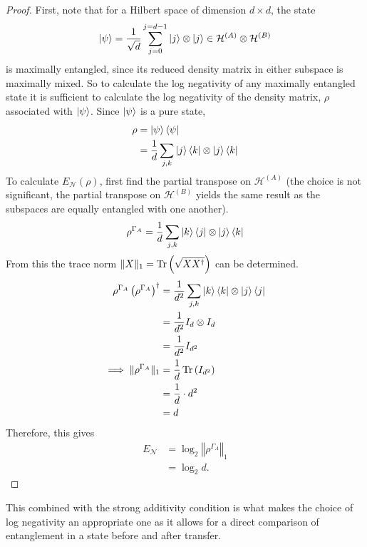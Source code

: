 \begin{proof}
    First, note that for a Hilbert space of dimension $d\times d$, the state
    \begin{equation}
        \ket{\psi} = \frac{1}{\sqrt{d}}\sum_{j=0}^{j=d-1}\ket{j}\otimes\ket{j}\in \mathcal{H}^{(A)} \otimes \mathcal{H}^{(B)}
    \end{equation}
    is maximally entangled, since its reduced density matrix in either subspace is maximally mixed.
    So to calculate the log negativity of any maximally entangled state it is sufficient to calculate the log negativity of the density matrix, $\rho$ associated with $\ket{\psi}$.
    Since $\ket{\psi}$ is a pure state,
    \begin{align}
        \rho &= \ket{\psi}\bra{\psi}\\
        &=\frac{1}{d} \sum_{j,k}\ket{j}\bra{k}\otimes\ket{j}\bra{k}
    \end{align}
    To calculate $E_{\mathcal{N}}(\rho)$, first find the partial transpose on $\mathcal{H}^{(A)}$ (the choice is not significant, the partial transpose on $\mathcal{H}^{(B)}$ yields the same result as the subspaces are equally entangled with one another).
    \begin{align}
        \rho^{\Gamma_A} =\frac{1}{d} \sum_{j,k}\ket{k}\bra{j}\otimes\ket{j}\bra{k}
    \end{align}
    From this the trace norm $\Vert X\Vert_1 = \operatorname{Tr}\left(\sqrt{XX^{\dagger}}\right)$ can be determined.
    \begin{align}
        \rho^{\Gamma_A}\left(\rho^{\Gamma_A}\right)^{\dagger} &= \frac{1}{d^2} \sum_{j,k}\ket{k}\bra{k}\otimes\ket{j}\bra{j}\\
        &=\frac{1}{d^2}I_d\otimes I_d\\
        &=\frac{1}{d^2}I_{d^2}\\
        \implies \Vert\rho^{\Gamma_A}\Vert_1 &= \frac{1}{d}\operatorname{Tr}{\left(I_{d^2}\right)}\\
        &= \frac{1}{d}\cdot d^2\\
        &= d
    \end{align}
    Therefore, this gives
    \begin{align}
        E_{\mathcal{N}} &= \log_2\left\Vert \rho^{\Gamma_A}\right\Vert_1\\
        &= \log_2d.
    \end{align}
\end{proof}
This combined with the strong additivity condition is what makes the choice of log negativity an appropriate one as it allows for a direct comparison of entanglement in a state before and after transfer.
